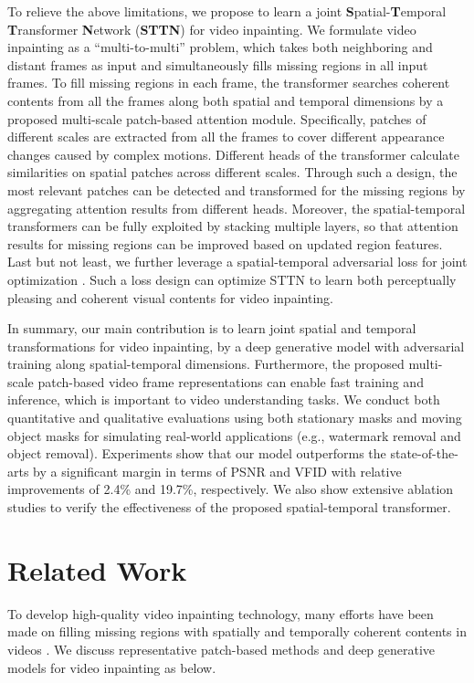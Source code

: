 \documentclass[runningheads]{llncs}
\begin{document}
To relieve the above limitations, we propose to learn a joint \textbf{S}patial-\textbf{T}emporal \textbf{T}ransformer \textbf{N}etwork (\textbf{STTN}) for video inpainting.
We formulate video inpainting as a ``multi-to-multi'' problem, which takes both neighboring and distant frames as input and simultaneously fills missing regions in all input frames.
To fill missing regions in each frame, 
the transformer searches coherent contents from all the frames along both spatial and temporal dimensions by a proposed multi-scale patch-based attention module. 
Specifically, patches of different scales are extracted from all the frames to cover different appearance changes caused by complex motions. 
Different heads of the transformer calculate similarities on spatial patches across different scales.
Through such a design, the most relevant patches can be detected and transformed for the missing regions by aggregating attention results from different heads. 
Moreover, the spatial-temporal transformers can be fully exploited by stacking multiple layers, so that attention results for missing regions can be improved based on updated region features.
Last but not least, we further leverage a spatial-temporal adversarial loss for joint optimization \cite{chang2019free,chang2019learnable}. 
Such a loss design can optimize STTN to learn both perceptually pleasing and coherent visual contents for video inpainting. 

In summary, our main contribution is to learn joint spatial and temporal transformations for video inpainting, by a deep generative model with adversarial training along spatial-temporal dimensions. 
Furthermore, the proposed multi-scale patch-based video frame representations can enable fast training and inference, which is important to video understanding tasks.
We conduct both quantitative and qualitative evaluations using both stationary masks and moving object masks for simulating real-world applications (e.g., watermark removal and object removal). 
Experiments show that our model outperforms the state-of-the-arts by a significant margin in terms of PSNR and VFID with relative improvements of 2.4\% and 19.7\%, respectively.
We also show extensive ablation studies to verify the effectiveness of the proposed spatial-temporal transformer.
 

\section{Related Work}
\label{sec:relate}
To develop high-quality video inpainting technology, many efforts have been made on filling missing regions with spatially and temporally coherent contents in videos \cite{bertalmio2001navier,huang2016temporally,lee2019copy,newson2014video,wang2019video,xu2019deep}. 
We discuss representative patch-based methods and deep generative models for video inpainting as below.
\end{document}
